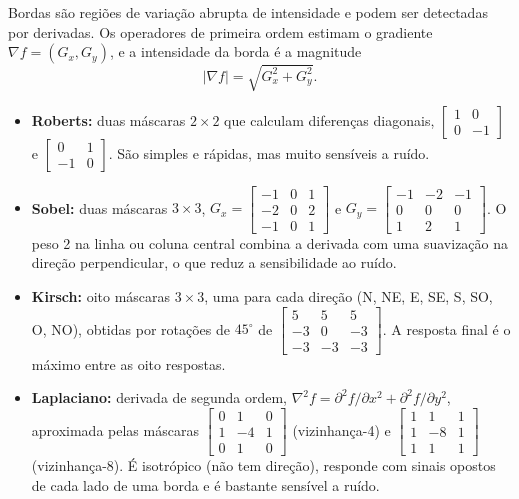 \documentclass[11pt,a4paper]{article}
\begin{document}
Bordas são regiões de variação abrupta de intensidade e podem ser detectadas por derivadas. Os operadores de primeira ordem estimam o gradiente $\nabla f = (G_x, G_y)$, e a intensidade da borda é a magnitude
\begin{equation}
|\nabla f| = \sqrt{G_x^2 + G_y^2}.
\end{equation}

\begin{itemize}
  \item \textbf{Roberts:} duas máscaras $2\times2$ que calculam diferenças diagonais,
  $\left[\begin{smallmatrix}1&0\\0&-1\end{smallmatrix}\right]$ e
  $\left[\begin{smallmatrix}0&1\\-1&0\end{smallmatrix}\right]$. São simples e rápidas, mas muito sensíveis a ruído.
  \item \textbf{Sobel:} duas máscaras $3\times3$,
  $G_x = \left[\begin{smallmatrix}-1&0&1\\-2&0&2\\-1&0&1\end{smallmatrix}\right]$ e
  $G_y = \left[\begin{smallmatrix}-1&-2&-1\\0&0&0\\1&2&1\end{smallmatrix}\right]$.
  O peso 2 na linha ou coluna central combina a derivada com uma suavização na direção perpendicular, o que reduz a sensibilidade ao ruído.
  \item \textbf{Kirsch:} oito máscaras $3\times3$, uma para cada direção (N, NE, E, SE, S, SO, O, NO), obtidas por rotações de $45^\circ$ de
  $\left[\begin{smallmatrix}5&5&5\\-3&0&-3\\-3&-3&-3\end{smallmatrix}\right]$.
  A resposta final é o máximo entre as oito respostas.
  \item \textbf{Laplaciano:} derivada de segunda ordem, $\nabla^2 f = \partial^2 f/\partial x^2 + \partial^2 f/\partial y^2$, aproximada pelas máscaras
  $\left[\begin{smallmatrix}0&1&0\\1&-4&1\\0&1&0\end{smallmatrix}\right]$ (vizinhança-4) e
  $\left[\begin{smallmatrix}1&1&1\\1&-8&1\\1&1&1\end{smallmatrix}\right]$ (vizinhança-8).
  É isotrópico (não tem direção), responde com sinais opostos de cada lado de uma borda e é bastante sensível a ruído.
\end{itemize}
\end{document}
